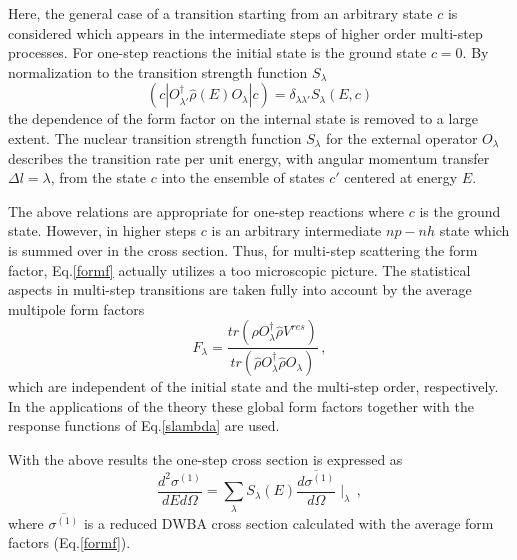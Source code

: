\documentclass[twocolumn,amsmath,amssymb,10pt,groupedaddress,a4paper]{revtex4}
\begin{document}
Here, the general case of a transition starting from an arbitrary
state $c$ is considered which appears in the intermediate steps of
higher order multi-step processes. For one-step reactions the initial
state is the ground state $c=0$. By normalization to the transition
strength function $S_{\lambda}$
\begin{equation}
(c|O_{\lambda'}^{\dag}\hat{\rho}(E)O_{\lambda}|c)=\delta_{\lambda\lambda'}S_{\lambda}(E,c)\label{slambda}
\end{equation}
\noindent the dependence of the form factor on the internal state is removed
to a large extent.
The nuclear transition strength function $S_{\lambda}$ for the external operator
$O_{\lambda}$ describes the transition rate per unit energy, with angular momentum transfer
$\Delta l=\lambda$, from the state
$c$ into the ensemble of states $c'$ centered at energy $E$.

The above relations are appropriate for one-step reactions where $c$
is the ground state. However, in higher steps $c$ is an arbitrary
intermediate $np-nh$ state which is summed over in the cross section.
Thus, for multi-step scattering the form factor, Eq.\ref{formf} actually
utilizes a too microscopic picture. The statistical aspects in multi-step
transitions are taken fully into account by the average multipole
form factors
\begin{equation}
F_{\lambda}=\frac{tr(\hat{\rho}O_{\lambda}^{\dag}\hat{\rho}V^{res})}{tr(\hat{\rho}O_{\lambda}^{\dag}\hat{\rho}O_{\lambda})}\,,\label{fav}
\end{equation}
\noindent which are independent of the initial state and the multi-step order,
respectively. In the applications of the theory these global form
factors together with the response functions of Eq.\ref{slambda}
are used.

With the above results the one-step cross section is expressed as
\begin{equation}
\frac{d^{2}\sigma^{(1)}}{dEd\Omega}=\sum_{\lambda}{S_{\lambda}(E)\overline{\frac{d\sigma^{(1)}}{d\Omega}}\mid_{\lambda}}\,,\label{sigma1}
\end{equation}
\noindent where $\overline{\sigma^{(1)}}$ is a reduced DWBA cross
section calculated with the average form factors (Eq.\ref{formf}).
\end{document}
